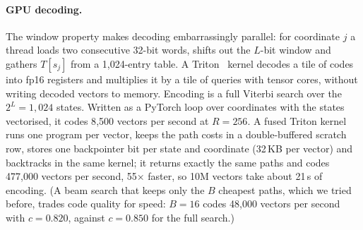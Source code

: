 \documentclass[fleqn,10pt]{wlscirep}
\begin{document}
\paragraph{GPU decoding.} The window property makes decoding embarrassingly parallel: for coordinate $j$ a thread loads two consecutive 32-bit words, shifts out the $L$-bit window and gathers $T[s_j]$ from a 1{,}024-entry table. A Triton~\cite{tillet2019triton} kernel decodes a tile of codes into fp16 registers and multiplies it by a tile of queries with tensor cores, without writing decoded vectors to memory. Encoding is a full Viterbi search over the $2^L=1{,}024$ states. Written as a PyTorch loop over coordinates with the states vectorised, it codes 8{,}500 vectors per second at $R=256$. A fused Triton kernel runs one program per vector, keeps the path costs in a double-buffered scratch row, stores one backpointer bit per state and coordinate (32\,KB per vector) and backtracks in the same kernel; it returns exactly the same paths and codes 477{,}000 vectors per second, 55$\times$ faster, so 10M vectors take about 21\,s of encoding. (A beam search that keeps only the $B$ cheapest paths, which we tried before, trades code quality for speed: $B=16$ codes 48{,}000 vectors per second with $c=0.820$, against $c=0.850$ for the full search.)
\end{document}
